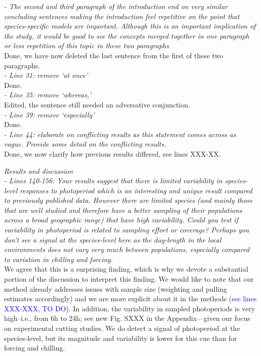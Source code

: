 \documentclass[11pt]{article}
\begin{document}
\emph{- The second and third paragraph of the introduction end on very similar concluding sentences making the introduction feel repetitive on the point that species-specific models are important. Although this is an important implication of the study, it would be good to see the concepts merged together in one paragraph or less repetition of this topic in these two paragraphs}\\
Done, we have now deleted the last sentence from the first of these two paragraphs.\\

\emph{- Line 31: remove ‘at once’}\\
Done.\\

\emph{- Line 35: remove ‘whereas,’}\\
Edited, the sentence still needed an adversative conjunction.\\

\emph{- Line 39: remove ‘especially’}\\
Done.\\

\emph{- Line 44: elaborate on conflicting results as this statement comes across as vague. Provide some detail on the conflicting results.}\\
Done, we now clarify how previous results differed, see lines XXX-XX.

\emph{Results and discussion}\\
\emph{- Lines 140-156: Your results suggest that there is limited variability in species-level responses to photoperiod which is an interesting and unique result compared to previously published data. However there are limited species (and mainly those that are well studied and therefore have a better sampling of their populations across a broad geographic range) that have high variability. Could you test if variability in photoperiod is related to sampling effort or coverage? Perhaps you don’t see a signal at the species-level here as the day-length in the local environments does not vary very much between populations, especially compared to variation in chilling and forcing.}\\

We agree that this is a surprising finding, which is why we devote a substantial portion of the discussion to interpret this finding. We would like to note that our method already addresses issues with sample size (weighting and pulling estimates accordingly) and we are more explicit about it in the methods (\textcolor{blue}{see lines XXX-XXX, TO DO}). In addition, the variability in sampled photoperiods is very high--i.e., from 6h to 24h; see new Fig. SXXX in the Appendix---given our focus on experimental cutting studies. We do detect a signal of photoperiod at the species-level, but its magnitude and variability is lower for this cue than for forcing and chilling.\\
\end{document}
